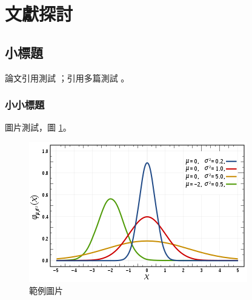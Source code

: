 \section{文獻探討}

\subsection{小標題}
論文引用測試 \cite{Rowe:2005:ASR}；引用多篇測試 \cite{Rowe:2005:ASR,vinet1989universal}。

\subsubsection{小小標題}
圖片測試，圖 \ref{figure:fig1}。

\begin{figure}[h]
    \centering
    \includegraphics[width=\textwidth]{figures/gambar.png}
    \caption{範例圖片}
    \label{figure:fig1}
\end{figure}
